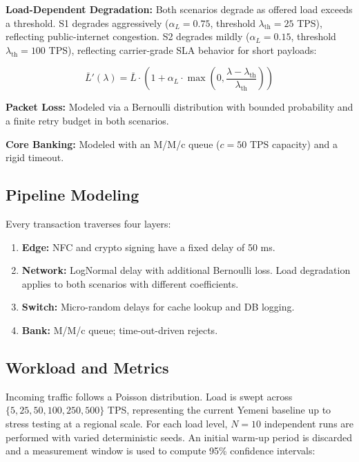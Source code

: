 \documentclass[conference,10pt]{IEEEtran}
\begin{document}
\textbf{Load-Dependent Degradation:} Both scenarios degrade as offered load exceeds a threshold. S1 degrades aggressively ($\alpha_L = 0.75$, threshold $\lambda_{\mathrm{th}} = 25$ TPS), reflecting public-internet congestion. S2 degrades mildly ($\alpha_L = 0.15$, threshold $\lambda_{\mathrm{th}} = 100$ TPS), reflecting carrier-grade SLA behavior for short payloads:

\begin{equation}
\bar{L}'(\lambda) = \bar{L} \cdot \left(1 + \alpha_L \cdot \max\left(0, \frac{\lambda - \lambda_{\mathrm{th}}}{\lambda_{\mathrm{th}}}\right)\right)
\label{eq:degradation}
\end{equation}

\textbf{Packet Loss:} Modeled via a Bernoulli distribution with bounded probability and a finite retry budget in both scenarios.

\textbf{Core Banking:} Modeled with an M/M/c queue ($c = 50$ TPS capacity) and a rigid timeout.

\subsection{Pipeline Modeling}

Every transaction traverses four layers:

\begin{enumerate}
\item \textbf{Edge:} NFC and crypto signing have a fixed delay of 50 ms.
\item \textbf{Network:} LogNormal delay with additional Bernoulli loss. Load degradation applies to both scenarios with different coefficients.
\item \textbf{Switch:} Micro-random delays for cache lookup and DB logging.
\item \textbf{Bank:} M/M/c queue; time-out-driven rejects.
\end{enumerate}

\subsection{Workload and Metrics}

Incoming traffic follows a Poisson distribution. Load is swept across $\{5, 25, 50, 100, 250, 500\}$ TPS, representing the current Yemeni baseline up to stress testing at a regional scale. For each load level, $N=10$ independent runs are performed with varied deterministic seeds. An initial warm-up period is discarded and a measurement window is used to compute 95\% confidence intervals:
\end{document}
